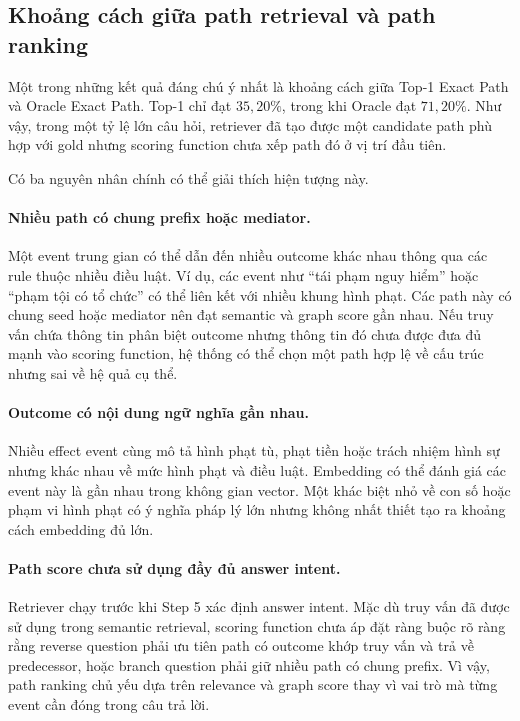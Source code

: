 \subsection{Khoảng cách giữa path retrieval và path ranking}

Một trong những kết quả đáng chú ý nhất là khoảng cách giữa Top-1 Exact Path
và Oracle Exact Path. Top-1 chỉ đạt \(35{,}20\%\), trong khi Oracle đạt
\(71{,}20\%\). Như vậy, trong một tỷ lệ lớn câu hỏi, retriever đã tạo được
một candidate path phù hợp với gold nhưng scoring function chưa xếp path đó
ở vị trí đầu tiên.

Có ba nguyên nhân chính có thể giải thích hiện tượng này.

\paragraph{Nhiều path có chung prefix hoặc mediator.}

Một event trung gian có thể dẫn đến nhiều outcome khác nhau thông qua các
rule thuộc nhiều điều luật. Ví dụ, các event như ``tái phạm nguy hiểm'' hoặc
``phạm tội có tổ chức'' có thể liên kết với nhiều khung hình phạt. Các path
này có chung seed hoặc mediator nên đạt semantic và graph score gần nhau.
Nếu truy vấn chứa thông tin phân biệt outcome nhưng thông tin đó chưa được
đưa đủ mạnh vào scoring function, hệ thống có thể chọn một path hợp lệ về
cấu trúc nhưng sai về hệ quả cụ thể.

\paragraph{Outcome có nội dung ngữ nghĩa gần nhau.}

Nhiều effect event cùng mô tả hình phạt tù, phạt tiền hoặc trách nhiệm hình
sự nhưng khác nhau về mức hình phạt và điều luật. Embedding có thể đánh giá
các event này là gần nhau trong không gian vector. Một khác biệt nhỏ về con
số hoặc phạm vi hình phạt có ý nghĩa pháp lý lớn nhưng không nhất thiết tạo
ra khoảng cách embedding đủ lớn.

\paragraph{Path score chưa sử dụng đầy đủ answer intent.}

Retriever chạy trước khi Step 5 xác định answer intent. Mặc dù truy vấn đã
được sử dụng trong semantic retrieval, scoring function chưa áp đặt ràng
buộc rõ ràng rằng reverse question phải ưu tiên path có outcome khớp truy
vấn và trả về predecessor, hoặc branch question phải giữ nhiều path có chung
prefix. Vì vậy, path ranking chủ yếu dựa trên relevance và graph score thay
vì vai trò mà từng event cần đóng trong câu trả lời.

